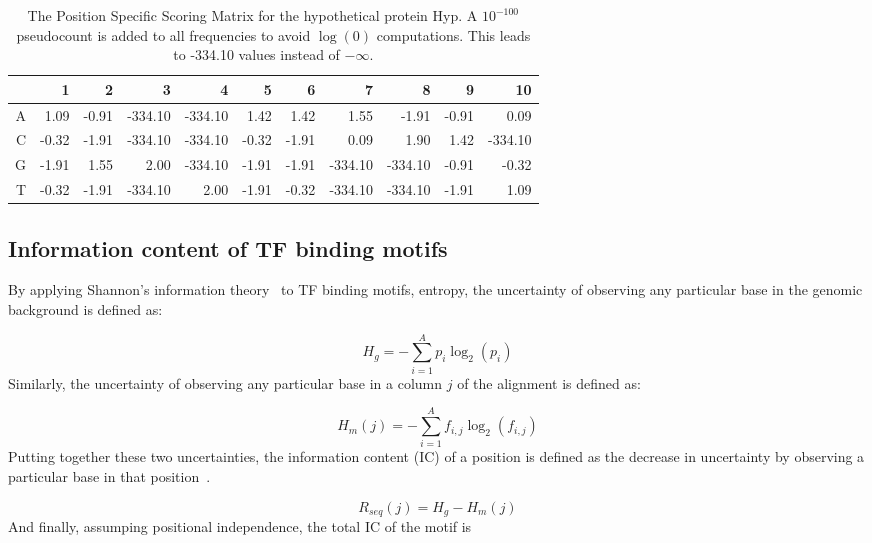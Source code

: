 \begin{table}
  \centering
  \caption[The Position Specific Scoring Matrix for the hypothetical
  protein.]{The Position Specific Scoring Matrix for the hypothetical protein
    Hyp. A $10^{-100}$ pseudocount is added to all frequencies to avoid
    $\log(0)$ computations. This leads to -334.10 values
    instead of $-\infty$.}
  \label{tab:pssm}
  \begin{tabular}{|r|r|r|r|r|r|r|r|r|r|r|}
\hline
  &     1 &   2 &    3 &    4 &    5 &    6 &    7 &    8 &    9 & 10\\
\hline
A &  1.09 & -0.91 & -334.10 & -334.10 &  1.42 &  1.42 &  1.55   & -1.91 & -0.91&   0.09\\
\hline
C & -0.32 & -1.91 & -334.10 & -334.10 & -0.32 & -1.91 &  0.09   & 1.90  & 1.42 & -334.10\\
\hline
G & -1.91 &  1.55 &  2.00   & -334.10 & -1.91 & -1.91 & -334.10 & -334.10 &  -0.91 & -0.32\\
\hline
T & -0.32 & -1.91 & -334.10 &  2.00   & -1.91 & -0.32 & -334.10 & -334.10 &  -1.91 &  1.09\\
\hline
  \end{tabular}
\end{table}

\subsection{Information content of TF binding motifs}

By applying Shannon’s information theory~\cite{shannon1948mathematical} to TF
binding motifs, entropy, the uncertainty of observing any particular base in
the genomic background is defined as:

\begin{equation}
  \label{eq:hg}
  H_g = -\displaystyle\sum_{i=1}^A p_i \log_2(p_i)
\end{equation}
Similarly, the uncertainty of observing any particular base in a column $j$ of
the alignment is defined as:

\begin{equation}
  \label{eq:hm}
  H_m(j) = -\displaystyle\sum_{i=1}^A f_{i, j} \log_2(f_{i, j})
\end{equation}
Putting together these two uncertainties, the information content (IC) of a
position is defined as the decrease in uncertainty by observing a particular
base in that position~\cite{schneider1986information}.

\begin{equation}
  \label{eq:rseq}
  R_{seq}(j) = H_g - H_m(j)
\end{equation}
And finally, assumping positional independence, the total IC of the motif is

